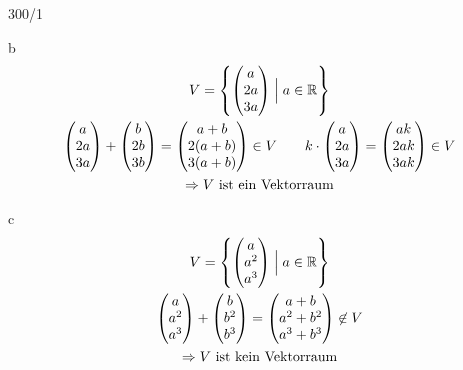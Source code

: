 \begin{exercise}{300/1}
  \item [b]
  \begin{gather*}
    V = \left\{\begin{pmatrix}a \\ 2a \\ 3a\end{pmatrix} \Bigm| a \in \mathbb{R}\right\} \\
    \begin{pmatrix}a \\ 2a \\ 3a\end{pmatrix} + \begin{pmatrix}b \\ 2b \\ 3b\end{pmatrix} = \begin{pmatrix}a + b \\ 2(a + b) \\ 3(a + b)\end{pmatrix} \in V \qquad k \cdot \begin{pmatrix}a \\ 2a \\ 3a\end{pmatrix} = \begin{pmatrix}ak \\ 2ak \\ 3ak\end{pmatrix} \in V \\
    \Rightarrow \text{$V$ ist ein Vektorraum}
  \end{gather*}
  \item [c]
  \begin{gather*}
    V = \left\{\begin{pmatrix}a \\ a^2 \\ a^3\end{pmatrix} \Bigm| a \in \mathbb{R}\right\} \\
    \begin{pmatrix}a \\ a^2 \\ a^3\end{pmatrix} + \begin{pmatrix}b \\ b^2 \\ b^3\end{pmatrix} = \begin{pmatrix}a + b \\ a^2 + b^2 \\ a^3 + b^3 \end{pmatrix} \not\in V \\
    \Rightarrow \text{$V$ ist kein Vektorraum}
  \end{gather*}
\end{exercise}
